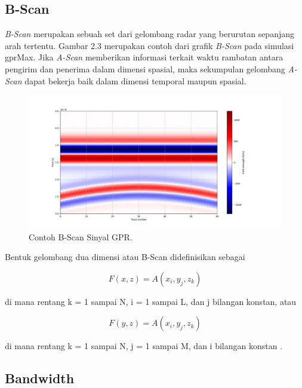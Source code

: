 \subsection{B-Scan}
\label{subsec:bScan}

\emph{B-Scan} merupakan sebuah set dari gelombang radar yang berurutan sepanjang arah tertentu. 
Gambar 2.3 merupakan contoh dari grafik \emph{B-Scan} pada simulasi gprMax. 
Jika \emph{A-Scan} memberikan informasi terkait waktu rambatan antara pengirim dan penerima dalam dimensi spasial, maka sekumpulan gelombang \emph{A-Scan} dapat bekerja baik dalam dimensi temporal maupun spasial.

\begin{figure}[ht]
  \centering
  \includegraphics[scale=0.35]{gambar/GPRBscan.jpg}
  \caption{Contoh B-Scan Sinyal GPR.}
  \label{fig:BscanGPR}
\end{figure}

Bentuk gelombang dua dimensi atau B-Scan didefinisikan sebagai

\begin{equation}
  \label{eq:Bscanx}
  F(x,z)=A( x_{i} , y_{j} , z_{k} )
\end{equation}

di mana rentang k = 1 sampai N, i = 1 sampai L, dan j bilangan konstan, atau

\begin{equation}
  \label{eq:Bscany}
  F(y,z)=A( x_{i} , y_{j} , z_{k} )
\end{equation}

di mana rentang k = 1 sampai N, j = 1 sampai M, dan i bilangan konstan \parencite{danielDvd}.

\subsection{Bandwidth}
\label{subsec:bandwidth}


